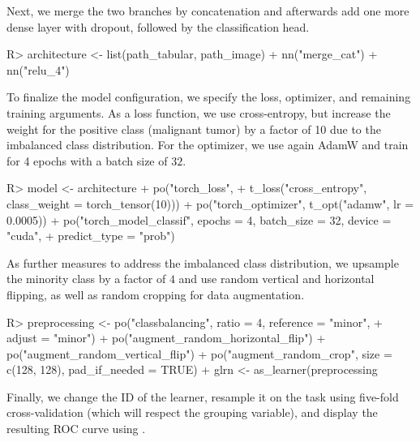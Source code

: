\documentclass[article]{jss}
\theoremstyle{definition}
\begin{document}
Next, we merge the two branches by concatenation and afterwards add one more dense layer with dropout, followed by the classification head.

\begin{CodeInput}
R> architecture <- list(path_tabular, path_image) %
+    nn("merge_cat") %
+    nn("relu_4") %
\end{CodeInput}

To finalize the model configuration, we specify the loss, optimizer, and remaining training arguments.
As a loss function, we use cross-entropy, but increase the weight for the positive class (malignant tumor) by a factor of 10 due to the imbalanced class distribution.
For the optimizer, we use again AdamW and train for 4 epochs with a batch size of $32$.

\begin{CodeInput}
R> model <- architecture %
+    po("torch_loss",
+      t_loss("cross_entropy", class_weight = torch_tensor(10))) %
+    po("torch_optimizer", t_opt("adamw", lr = 0.0005)) %
+    po("torch_model_classif", epochs = 4, batch_size = 32, device = "cuda",
+      predict_type = "prob")
\end{CodeInput}

As further measures to address the imbalanced class distribution, we upsample the minority class by a factor of $4$ and use random vertical and horizontal flipping, as well as random cropping for data augmentation.

\begin{CodeInput}
R> preprocessing <- po("classbalancing", ratio = 4, reference = "minor",
+      adjust = "minor") %
+    po("augment_random_horizontal_flip") %
+    po("augment_random_vertical_flip") %
+    po("augment_random_crop", size = c(128, 128), pad_if_needed = TRUE)
+  glrn <- as_learner(preprocessing %
\end{CodeInput}

Finally, we change the ID of the learner, resample it on the task using five-fold cross-validation (which will respect the grouping variable), and display the resulting ROC curve using  \citep{ref-mlr3viz2025}.

\end{document}
